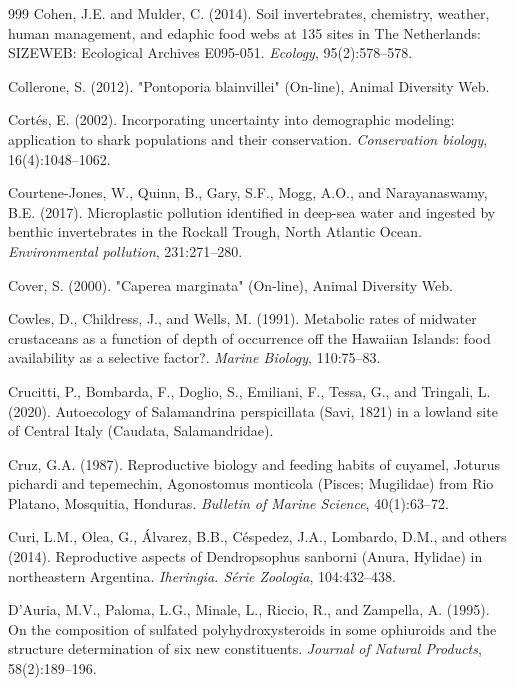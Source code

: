 \begin{thebibliography}{999}
Cohen, J.E. and Mulder, C. (2014). Soil invertebrates, chemistry, weather, human management, and edaphic food webs at 135 sites in The Netherlands: SIZEWEB: Ecological Archives E095-051. \textit{Ecology}, 95(2):578--578.

Collerone, S. (2012). "Pontoporia blainvillei" (On-line), {A}nimal {D}iversity {W}eb.

Cort{\'e}s, E. (2002). Incorporating uncertainty into demographic modeling: application to shark populations and their conservation. \textit{Conservation biology}, 16(4):1048--1062.

Courtene-Jones, W., Quinn, B., Gary, S.F., Mogg, A.O., and Narayanaswamy, B.E. (2017). Microplastic pollution identified in deep-sea water and ingested by benthic invertebrates in the Rockall Trough, North Atlantic Ocean. \textit{Environmental pollution}, 231:271--280.

Cover, S. (2000). "Caperea marginata" (On-line), {Animal Diversity Web}.

Cowles, D., Childress, J., and Wells, M. (1991). Metabolic rates of midwater crustaceans as a function of depth of occurrence off the Hawaiian Islands: food availability as a selective factor?. \textit{Marine Biology}, 110:75--83.

Crucitti, P., Bombarda, F., Doglio, S., Emiliani, F., Tessa, G., and Tringali, L. (2020). Autoecology of Salamandrina perspicillata (Savi, 1821) in a lowland site of Central Italy (Caudata, Salamandridae).

Cruz, G.A. (1987). Reproductive biology and feeding habits of cuyamel, Joturus pichardi and tepemechin, Agonostomus monticola (Pisces; Mugilidae) from Rio Platano, Mosquitia, Honduras. \textit{Bulletin of Marine Science}, 40(1):63--72.

Curi, L.M., Olea, G., {\'A}lvarez, B.B., C{\'e}spedez, J.A., Lombardo, D.M., and others (2014). Reproductive aspects of Dendropsophus sanborni (Anura, Hylidae) in northeastern Argentina. \textit{Iheringia. S{\'e}rie Zoologia}, 104:432--438.

D'Auria, M.V., Paloma, L.G., Minale, L., Riccio, R., and Zampella, A. (1995). On the composition of sulfated polyhydroxysteroids in some ophiuroids and the structure determination of six new constituents. \textit{Journal of Natural Products}, 58(2):189--196.


\end{thebibliography}
